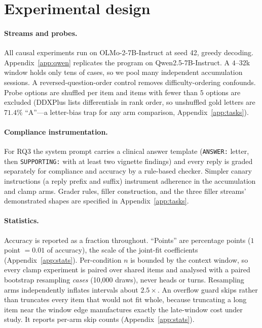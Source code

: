 \documentclass{article}
\begin{document}
\section{Experimental design}
\label{sec:design}

\paragraph{Streams and probes.}
All causal experiments run on OLMo-2-7B-Instruct at seed 42, greedy decoding.
Appendix~\ref{app:qwen} replicates the program on Qwen2.5-7B-Instruct. A $4$--$32$k window
holds only tens of cases, so we pool many independent accumulation sessions. A
reversed-question-order control removes difficulty-ordering confounds. Probe options are shuffled
per item and items with fewer than $5$ options are excluded (DDXPlus lists differentials in rank
order, so unshuffled gold letters are $71.4\%$ ``A''---a letter-bias trap for any arm comparison,
Appendix~\ref{app:tasks}).

\paragraph{Compliance instrumentation.}
For RQ3 the system prompt carries a clinical answer template (\texttt{ANSWER:} letter, then
\texttt{SUPPORTING:} with at least two vignette findings) and every reply is graded separately
for compliance and accuracy by a rule-based checker. Simpler canary instructions (a reply prefix
and suffix) instrument adherence in the accumulation and clamp arms. Grader rules, filler
construction, and the three filler streams' demonstrated shapes are specified in
Appendix~\ref{app:tasks}.

\paragraph{Statistics.}
Accuracy is reported as a fraction throughout. ``Points'' are percentage points
($1$ point $=0.01$ of accuracy), the scale of the joint-fit coefficients
(Appendix~\ref{app:stats}). Per-condition $n$ is bounded by the context window, so every clamp experiment is paired over
shared items and analysed with a paired bootstrap resampling \emph{cases} (10{,}000 draws), never
heads or turns. Resampling arms independently inflates intervals about $2.5\times$. An overflow
guard skips rather than truncates every item that would not fit whole, because truncating a
long item near the window edge manufactures exactly the late-window cost under study. It
reports per-arm skip counts (Appendix~\ref{app:stats}).
\end{document}
